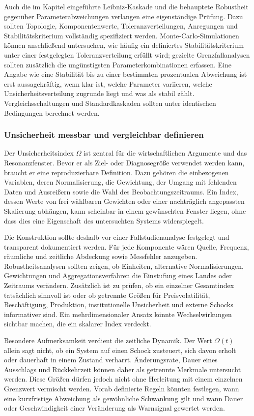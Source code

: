 \documentclass[a4paper,12pt,twoside]{report}
\theoremstyle{definition}
\begin{document}
Auch die im Kapitel eingeführte Leibniz-Kaskade und die behauptete Robustheit gegenüber Parameterabweichungen verlangen eine eigenständige Prüfung. Dazu sollten Topologie, Komponentenwerte, Toleranzverteilungen, Anregungen und Stabilitätskriterium vollständig spezifiziert werden. Monte-Carlo-Simulationen können anschließend untersuchen, wie häufig ein definiertes Stabilitätskriterium unter einer festgelegten Toleranzverteilung erfüllt wird; gezielte Grenzfallanalysen sollten zusätzlich die ungünstigsten Parameterkombinationen erfassen. Eine Angabe wie eine Stabilität bis zu einer bestimmten prozentualen Abweichung ist erst aussagekräftig, wenn klar ist, welche Parameter variieren, welche Unsicherheitsverteilung zugrunde liegt und was als stabil zählt. Vergleichsschaltungen und Standardkaskaden sollten unter identischen Bedingungen berechnet werden.

\subsubsection{Unsicherheit messbar und vergleichbar definieren}

Der Unsicherheitsindex $\Omega$ ist zentral für die wirtschaftlichen Argumente und das Resonanzfenster. Bevor er als Ziel- oder Diagnosegröße verwendet werden kann, braucht er eine reproduzierbare Definition. Dazu gehören die einbezogenen Variablen, deren Normalisierung, die Gewichtung, der Umgang mit fehlenden Daten und Ausreißern sowie die Wahl des Beobachtungszeitraums. Ein Index, dessen Werte von frei wählbaren Gewichten oder einer nachträglich angepassten Skalierung abhängen, kann scheinbar in einem gewünschten Fenster liegen, ohne dass dies eine Eigenschaft des untersuchten Systems widerspiegelt.

Die Konstruktion sollte deshalb vor einer Fallstudienanalyse festgelegt und transparent dokumentiert werden. Für jede Komponente wären Quelle, Frequenz, räumliche und zeitliche Abdeckung sowie Messfehler anzugeben. Robustheitsanalysen sollten zeigen, ob Einheiten, alternative Normalisierungen, Gewichtungen und Aggregationsverfahren die Einstufung eines Landes oder Zeitraums verändern. Zusätzlich ist zu prüfen, ob ein einzelner Gesamtindex tatsächlich sinnvoll ist oder ob getrennte Größen für Preisvolatilität, Beschäftigung, Produktion, institutionelle Unsicherheit und externe Schocks informativer sind. Ein mehrdimensionaler Ansatz könnte Wechselwirkungen sichtbar machen, die ein skalarer Index verdeckt.

Besondere Aufmerksamkeit verdient die zeitliche Dynamik. Der Wert $\Omega(t)$ allein sagt nicht, ob ein System auf einen Schock zusteuert, sich davon erholt oder dauerhaft in einem Zustand verharrt. Änderungsrate, Dauer eines Ausschlags und Rückkehrzeit können daher als getrennte Merkmale untersucht werden. Diese Größen dürfen jedoch nicht ohne Herleitung mit einem einzelnen Grenzwert vermischt werden. Vorab definierte Regeln könnten festlegen, wann eine kurzfristige Abweichung als gewöhnliche Schwankung gilt und wann Dauer oder Geschwindigkeit einer Veränderung als Warnsignal gewertet werden.
\end{document}
